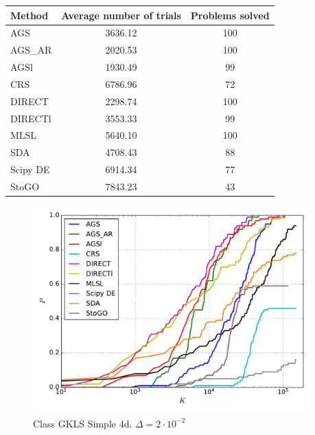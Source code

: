 \documentclass[a4paper]{article}
\begin{document}
\begin{tabular}{lcc}
\hline
 Method   &  Average number of trials  &  Problems solved  \\
\hline
 AGS      &          3636.12           &        100        \\
 AGS\_AR   &          2020.53           &        100        \\
 AGSl     &          1930.49           &        99         \\
 CRS      &          6786.96           &        72         \\
 DIRECT   &          2298.74           &        100        \\
 DIRECTl  &          3553.33           &        99         \\
 MLSL     &          5640.10           &        100        \\
 SDA      &          4708.43           &        88         \\
 Scipy DE &          6914.34           &        77         \\
 StoGO    &          7843.23           &        43         \\
\hline
\end{tabular}
\begin{figure}[H]
  \center
  \includegraphics[width=0.95\textwidth]{../experiments/gklss4d/cmc.pdf}
  \caption{Class GKLS Simple 4d. $\Delta=2\cdot10^{-2}$}
\end{figure}
\end{document}
